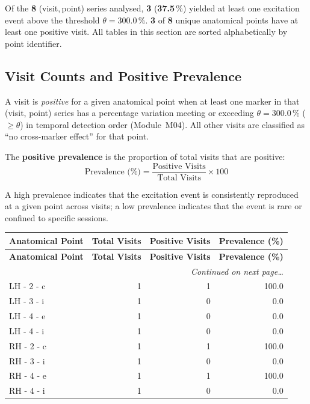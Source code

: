 \documentclass[a4paper,11pt]{article}
\begin{document}
\noindent
Of the \textbf{8} (visit,\,point) series analysed,
\textbf{3} (\textbf{37.5}\,\%) yielded at least one
excitation event above the threshold $\theta = 300.0\,\%$.
\textbf{3} of \textbf{8} unique anatomical points
have at least one positive visit.
All tables in this section are sorted alphabetically by point identifier.

\subsection{Visit Counts and Positive Prevalence}

A visit is \emph{positive} for a given anatomical point when at least one marker in that
(visit, point) series has a percentage variation meeting or exceeding
$\theta = 300.0\,\%$ ($\geq \theta$) in temporal detection order (Module~M04).
All other visits are classified as ``no cross-marker effect'' for that point.

The \textbf{positive prevalence} is the proportion of total visits that are positive:
\[
  \text{Prevalence (\%)} = \frac{\text{Positive Visits}}{\text{Total Visits}} \times 100
\]

A high prevalence indicates that the excitation event is consistently reproduced at a given
point across visits; a low prevalence indicates that the event is rare or confined to
specific sessions.

\begin{small}
\begin{longtable}{p{5cm}rrr}
\toprule
\textbf{Anatomical Point} &
\textbf{Total Visits} &
\textbf{Positive Visits} &
\textbf{Prevalence (\%)} \\
\midrule
\endfirsthead
\toprule
\textbf{Anatomical Point} &
\textbf{Total Visits} &
\textbf{Positive Visits} &
\textbf{Prevalence (\%)} \\
\midrule
\endhead
\midrule
\multicolumn{4}{r}{\small\emph{Continued on next page\ldots}} \\
\endfoot
\bottomrule
\endlastfoot
LH - 2 - c & 1 & 1 & 100.0 \\
LH - 3 - i & 1 & 0 & 0.0 \\
LH - 4 - e & 1 & 0 & 0.0 \\
LH - 4 - i & 1 & 0 & 0.0 \\
RH - 2 - c & 1 & 1 & 100.0 \\
RH - 3 - i & 1 & 0 & 0.0 \\
RH - 4 - e & 1 & 1 & 100.0 \\
RH - 4 - i & 1 & 0 & 0.0 \\
\end{longtable}
\end{small}
\end{document}
